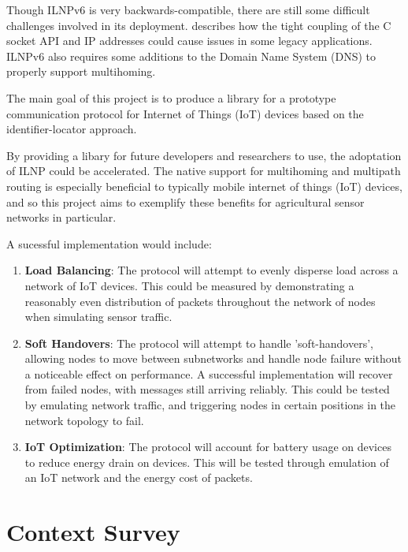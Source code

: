 \documentclass[12pt]{article}
\begin{document}
Though ILNPv6 is very backwards-compatible, there are still some difficult challenges involved in its deployment. \cite{ipwithoutip} describes how the tight coupling of the C socket API and IP addresses could cause issues in some legacy applications. ILNPv6 also requires some additions to the Domain Name System (DNS) to properly support multihoming.

The main goal of this project is to produce a library for a prototype communication
protocol for Internet of Things (IoT) devices based on the identifier-locator
approach. 

By providing a libary for future developers and researchers to use, the adoptation of ILNP could be accelerated. The native support for multihoming and multipath routing is especially beneficial to typically mobile internet of things (IoT) devices, and so this project aims to exemplify these benefits for agricultural sensor networks in particular. 

\vspace{\baselineskip}
\noindent A sucessful implementation would include:

\begin{enumerate}
	\item \textbf{Load Balancing}: The protocol will attempt to evenly disperse load across a network of IoT
devices. This could be measured by demonstrating a reasonably even distribution of packets throughout the network of nodes when simulating sensor traffic. 
	\item \textbf{Soft Handovers}: The protocol will attempt to handle ’soft-handovers’, allowing nodes to
move between subnetworks and handle node failure without a noticeable effect on performance. A successful implementation will recover from failed nodes, with messages still arriving reliably. This could be tested by emulating network traffic, and triggering nodes in certain positions in the network topology to fail.

\item \textbf{IoT Optimization}: The protocol will account for battery usage on devices to reduce energy drain
on devices. This will be tested through emulation of an IoT network and the energy cost of packets.
\end{enumerate}

\pagebreak
\section{Context Survey}
\end{document}

